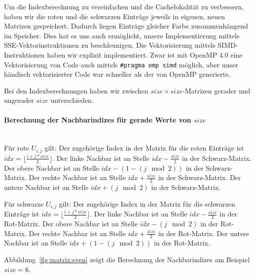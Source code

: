 \documentclass{article}
\begin{document}
Um die Indexberechnung zu vereinfachen und die Cachelokalität zu verbessern, haben wir die roten und die schwarzen Einträge jeweils in eigenen, neuen Matrizen gespeichert. Dadurch liegen Einträge gleicher Farbe zusammenhängend im Speicher. Dies hat es uns auch ermöglicht, unsere Implementierung mittels SSE-Vektorinstruktionen zu beschleunigen. Die Vektorisierung mittels SIMD-Instruktionen haben wir explizit implementiert. Zwar ist mit OpenMP 4.0 eine Vektorisierung von Code auch mittels \texttt{\#pragma omp simd} möglich, aber unser händisch vektorisierter Code war schneller als der von OpenMP generierte.

Bei den Indexberechnungen haben wir zwischen $size \times size$-Matrizen gerader und ungerader $size$ unterschieden.

\paragraph{Berechnung der Nachbarindizes für gerade Werte von $size$}~\\
Für rote $U_{i,j}$ gilt: Der zugehörige Index in der Matrix für die roten Einträge ist $idx = \lfloor\frac{i+j*size}{2}\rfloor$. Der linke Nachbar ist an Stelle $idx - \frac{size}{2}$ in der Schwarz-Matrix. Der obere Nachbar ist an Stelle $idx - (1-(j \mod 2))$ in der Schwarz-Matrix. Der rechte Nachbar ist an Stelle $idx + \frac{size}{2}$ in der Schwarz-Matrix. Der untere Nachbar ist an Stelle $idx + (j \mod 2)$ in der Schwarz-Matrix.



Für schwarze $U_{i,j}$ gilt: Der zugehörige Index in der Matrix für die schwarzen Einträge ist $idx = \lfloor\frac{i+j*size}{2}\rfloor$. Der linke Nachbar ist an Stelle $idx - \frac{size}{2}$ in der Rot-Matrix. Der obere Nachbar ist an Stelle $idx - (j \mod 2)$ in der Rot-Matrix. Der rechte Nachbar ist an Stelle $idx + \frac{size}{2}$ in der Rot-Matrix. Der untere Nachbar ist an Stelle $idx + (1- (j \mod 2))$ in der Rot-Matrix.

Abbildung~\ref{fig:matrix:even} zeigt die Berechnung der Nachbarindizes am Beispiel $size=6$.
\end{document}

